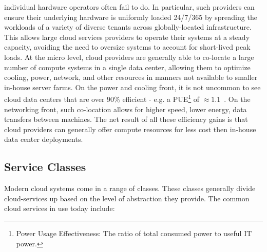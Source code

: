 \begin{packed_desc}
  individual hardware operators often fail to do. In particular, such
  providers can ensure their underlying hardware is uniformly loaded
  24/7/365 by spreading the workloads of a variety of diverse tenants
  across globally-located infrastructure. This allows large cloud
  services providers to operate their systems at a steady capacity,
  avoiding the need to oversize systems to account for short-lived
  peak loads. At the micro level, cloud providers are generally able
  to co-locate a large number of compute systems in a single data
  center, allowing them to optimize cooling, power, network, and other
  resources in manners not available to smaller in-house server
  farms. On the power and cooling front, it is not uncommon to see
  cloud data centers that are over $90\%$ efficient - e.g. a
  PUE\footnote{Power Usage Effectiveness: The ratio of total consumed
    power to useful IT power.} of
  $\approx1.1$~\cite{google-efficiency}. On the networking front, such
  co-location allows for higher speed, lower energy, data transfers
  between machines. The net result of all these efficiency gains is
  that cloud providers can generally offer compute resources for less
  cost then in-house data center deployments.
\end{packed_desc}

\subsection{Service Classes}

Modern cloud systems come in a range of classes. These classes
generally divide cloud-services up based on the level of abstraction
they provide. The common cloud services in use today include:

